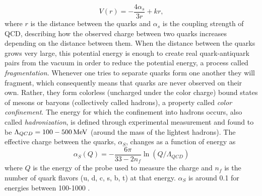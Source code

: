 \begin{equation}
  V(r)=-\frac{4\alpha_s}{3r}+kr,
\end{equation} 
where $r$ is the distance between the quarks and $\alpha_s$ is the coupling strength of QCD, describing how the observed charge between two quarks increases depending on the distance between them. When the distance between the quarks grows very large, this potential energy is enough to create real quark-antiquark pairs from the vacuum in order to reduce the potential energy, a process called \emph{fragmentation}. Whenever one tries to separate quarks form one another they will fragment, which consequently means that quarks are never observed on their own. Rather, they form colorless (uncharged under the color charge) bound states of mesons or baryons (collectively called hadrons), a property called \emph{color confinement}. The energy for which the confinement into hadrons occurs, also called \emph{hadronization}, is defined through experimental measurement and found to be $\Lambda_{QCD}=100-500 \,\text{Me\hspace{-.08em}V}$ (around the mass of the lightest hadrons). The effective charge between the quarks, $\alpha_S$, changes as a function of energy as
 \begin{equation}
   \alpha_S(Q)=-\frac{6\pi}{33-2n_f}\ln(Q/\Lambda_{QCD})
 \end{equation}
where $Q$ is the energy of the probe used to measure the charge and $n_f$ is the number of quark flavors (u, d, c, s, b, t) at that energy. $\alpha_S$ is around 0.1 for energies between 100-1000 \GeV.

